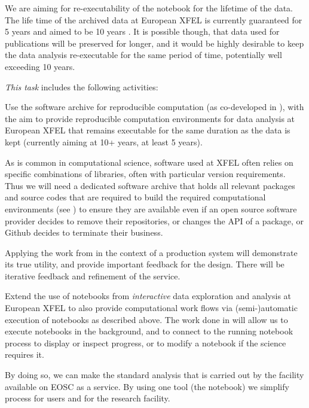 \begin{task}[
  title=Reproducible X-ray crystallography workflows at European XFEL,
  id=reproducibility-xfel,
  lead=XFEL,
  PM=36,
  wphases={6-48},
  partners={}
  ]
  We are aiming for re-executability of the notebook for the lifetime
  of the data. The life time of the archived data at European XFEL is
  currently guaranteed for 5 years and aimed to be 10 years
  \cite{EuXFEL-datapolicy-2017}. It is possible though, that data used
  for publications will be preserved for longer, and it would be
  highly desirable to keep the data analysis re-executable for the
  same period of time, potentially well exceeding 10 years.

  \medskip \emph{This task} includes the following activities:
  \begin{compactitem}
  \item Use the software archive for reproducible computation
    (as co-developed in ), with
    the aim to provide reproducible computation environments for data analysis at
    European XFEL that remains executable for the same duration as the
    data is kept (currently aiming at 10+ years, at least 5 years).

    As is common in computational science, software used at XFEL often
    relies on specific combinations of libraries, often with
    particular version requirements. Thus we will need a dedicated
    software archive that holds all relevant packages and source codes
    that are required to build the required computational environments
    (see ) to ensure they are
    available even if an open source software provider decides to
    remove their repositories, or changes the API of a package, or
    Github decides to terminate their business.

    Applying the work from  in the
    context of a production system will demonstrate its true utility,
    and provide important feedback for the design. There will be
    iterative feedback and refinement of the service.

  \item Extend the use of notebooks from \emph{interactive} data
    exploration and analysis at European XFEL to also provide
    computational work flows via (semi-)automatic execution of
    notebooks as described above. The work done in
     will allow us to execute notebooks in
    the background, and to connect to the running notebook process to
    display or inspect progress, or to modify a notebook if the
    science requires it.

    By doing so, we can make the standard analysis that is carried out
    by the facility available on EOSC as a service. By using one tool
    (the notebook) we simplify process for users and for the research
    facility.


\end{compactitem}
\end{task}
